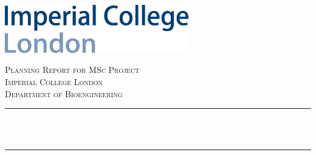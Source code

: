 \begin{titlepage}

\newcommand{\HRule}{\rule{\linewidth}{0.5mm}} %

\newcommand{\quickwordcount}[1]{%
  \immediate\write18{texcount -1 -sum -merge -q #1.tex output.bbl > #1-words.sum }%
  
}


\includegraphics[width=8cm]{title/logo.png}\\[1.8cm] %
 

\center %


\textsc{\LARGE Planning Report for MSc Project}\\[1.5cm] %
\textsc{\Large Imperial College London}\\[0.5cm] %
\textsc{\large Department of Bioengineering}\\[1.5cm] %

\makeatletter
\HRule \\[0.4cm]
{ \huge \bfseries \@title}\\[0.4cm] %
\HRule \\[1.5cm]
 


\end{titlepage}
